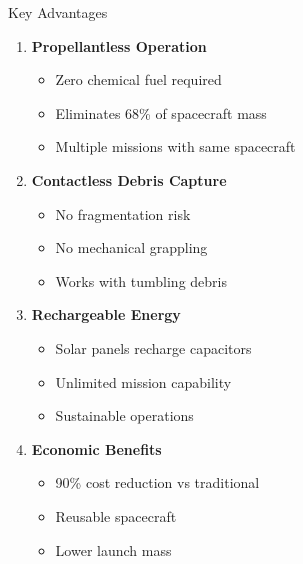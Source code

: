\documentclass[aspectratio=169]{beamer}
\begin{document}
\begin{frame}{Key Advantages}
\begin{enumerate}
    \item \textbf{Propellantless Operation}
    \begin{itemize}
        \item Zero chemical fuel required
        \item Eliminates 68\% of spacecraft mass
        \item Multiple missions with same spacecraft
    \end{itemize}

    \item \textbf{Contactless Debris Capture}
    \begin{itemize}
        \item No fragmentation risk
        \item No mechanical grappling
        \item Works with tumbling debris
    \end{itemize}

    \item \textbf{Rechargeable Energy}
    \begin{itemize}
        \item Solar panels recharge capacitors
        \item Unlimited mission capability
        \item Sustainable operations
    \end{itemize}

    \item \textbf{Economic Benefits}
    \begin{itemize}
        \item 90\% cost reduction vs traditional
        \item Reusable spacecraft
        \item Lower launch mass
    \end{itemize}
\end{enumerate}
\end{frame}
\end{document}

